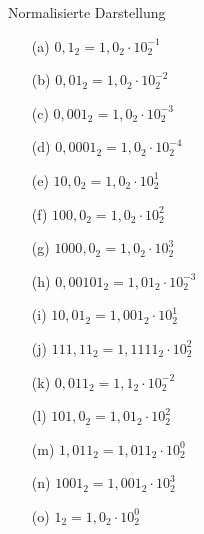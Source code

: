 \begin{exercise}{Normalisierte Darstellung}
\begin{solution}

\begin{center}
\begin{minipage}{0.3\textwidth}
\begin{itemize}
\item[(a)] $0{,}1_2    = 1{,}0_2 \cdot 10_2^{-1}$
\item[(b)] $0{,}01_2   = 1{,}0_2 \cdot 10_2^{-2}$
\item[(c)] $0{,}001_2  = 1{,}0_2 \cdot 10_2^{-3}$
\item[(d)] $0{,}0001_2 = 1{,}0_2 \cdot 10_2^{-4}$
\item[(e)] $10{,}0_2   = 1{,}0_2 \cdot 10_2^{1}$
\end{itemize}
\end{minipage}
\begin{minipage}{0.3\textwidth}
\begin{itemize}
\item[(f)] $100{,}0_2   = 1{,}0_2    \cdot 10_2^{2}$
\item[(g)] $1000{,}0_2  = 1{,}0_2    \cdot 10_2^{3}$
\item[(h)] $0{,}00101_2 = 1{,}01_2   \cdot 10_2^{-3}$
\item[(i)] $10{,}01_2   = 1{,}001_2  \cdot 10_2^{1}$
\item[(j)] $111{,}11_2  = 1{,}1111_2 \cdot 10_2^{2}$
\end{itemize}
\end{minipage}
\begin{minipage}{0.3\textwidth}
\begin{itemize}
\item[(k)] $0{,}011_2 = 1{,}1_2   \cdot 10_2^{-2}$
\item[(l)] $101{,}0_2 = 1{,}01_2  \cdot 10_2^{2}$
\item[(m)] $1{,}011_2 = 1{,}011_2 \cdot 10_2^{0}$
\item[(n)] $1001_2    = 1{,}001_2 \cdot 10_2^{3}$
\item[(o)] $1_2       = 1{,}0_2   \cdot 10_2^{0}$
\end{itemize}
\end{minipage}
\end{center}
\end{solution}

\end{exercise}
